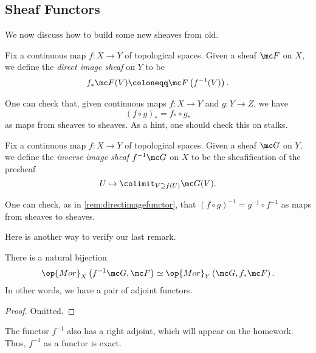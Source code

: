 \documentclass[../notes.tex]{subfiles}
\begin{document}
\subsection{Sheaf Functors}
We now discuss how to build some new sheaves from old.
\begin{definition}
	Fix a continuous map $f\colon X\to Y$ of topological spaces. Given a sheaf $\mc F$ on $X$, we define the \textit{direct image sheaf} on $Y$ to be
	\[f_*\mc F(V)\coloneqq\mc F\left(f^{-1}(V)\right).\]
\end{definition}
\begin{remark} \label{rem:directimagefunctor}
	One can check that, given continuous maps $f\colon X\to Y$ and $g\colon Y\to Z$, we have
	\[(f\circ g)_*=f_*\circ g_*\]
	as maps from sheaves to sheaves. As a hint, one should check this on stalks.
\end{remark}
\begin{definition}
	Fix a continuous map $f\colon X\to Y$ of topological spaces. Given a sheaf $\mc G$ on $Y$, we define the \textit{inverse image sheaf} $f^{-1}\mc G$ on $X$ to be the sheafification of the presheaf
	\[U\mapsto\colimit_{V\supseteq f(U)}\mc G(V).\]
\end{definition}
\begin{remark}
	One can check, as in \autoref{rem:directimagefunctor}, that $(f\circ g)^{-1}=g^{-1}\circ f^{-1}$ as maps from sheaves to sheaves.
\end{remark}
Here is another way to verify our last remark.
\begin{proposition}
	There is a natural bijection
	\[\op{Mor}_X\left(f^{-1}\mc G,\mc F\right)\simeq\op{Mor}_Y\left(\mc G,f_*\mc F\right).\]
	In other words, we have a pair of adjoint functors.
\end{proposition}
\begin{proof}
	Omitted.
\end{proof}
\begin{remark}
	The functor $f^{-1}$ also has a right adjoint, which will appear on the homework. Thus, $f^{-1}$ as a functor is exact.
\end{remark}
\end{document}
